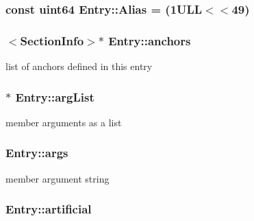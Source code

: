 \subsubsection[{Alias}]{\setlength{\rightskip}{0pt plus 5cm}const {\bf uint64} Entry\+::\+Alias = (1\+U\+L\+L$<$$<$49)\hspace{0.3cm}{\ttfamily [static]}}\label{class_entry_a2b7df5462b391501de62d2f2238f0a75}
\hypertarget{class_entry_a4608d738e9d9c7798d8b83a2846b3d12}{}
\subsubsection[{anchors}]{$<${\bf Section\+Info}$>$$\ast$ Entry\+::anchors}\label{class_entry_a4608d738e9d9c7798d8b83a2846b3d12}


list of anchors defined in this entry 

\hypertarget{class_entry_a7dfa4587991698fbc8550e563cd71948}{}
\subsubsection[{arg\+List}]{$\ast$ Entry\+::arg\+List}\label{class_entry_a7dfa4587991698fbc8550e563cd71948}


member arguments as a list 

\hypertarget{class_entry_a795acc50f8bb2497b2385ee715304076}{}
\subsubsection[{args}]{ Entry\+::args}\label{class_entry_a795acc50f8bb2497b2385ee715304076}


member argument string 

\hypertarget{class_entry_acbe763144d791b44aa3620b012d0dd30}{}
\subsubsection[{artificial}]{ Entry\+::artificial}\label{class_entry_acbe763144d791b44aa3620b012d0dd30}



